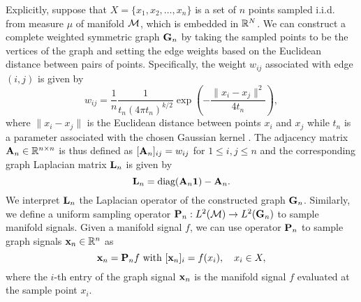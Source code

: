 Explicitly, suppose that $X= \{x_1, x_2,\dots, x_n\}$ is a set of $n$ points sampled i.i.d. from measure $\mu$ of manifold ${\mathcal M}$, which is embedded in ${\mathbb R}^N$. We can construct a complete weighted symmetric graph ${\mathbf G}_n$ by taking the sampled points to be the vertices of the graph and setting the edge weights based on the Euclidean distance between pairs of points. Specifically, the weight $w_{ij}$ associated with edge $(i,j)$ is given by
\begin{equation}\label{eqn:weight}
    w_{ij}=\frac{1}{n}\frac{1}{t_n(4\pi t_n)^{k/2}}\exp\left(-\frac{\|x_i-x_j\|^2}{4t_n}\right),
\end{equation}
where $\|x_i-x_j\|$ is the Euclidean distance between points $x_i$ and $x_j$ while $t_n$ is a parameter associated with the chosen Gaussian kernel \cite{belkin2008towards}. The adjacency matrix ${\mathbf A}_n \in {\mathbb R}^{n\times n}$ is thus defined as $[{\mathbf A}_n]_{ij}=w_{ij}$ for $1 \leq i,j\leq n$ and the corresponding graph Laplacian matrix ${\mathbf L}_n$ \cite{merris1995survey} is given by
\begin{equation}
    {\ensuremath{\mathbf L}}_n = \mbox{diag}({\mathbf A}_n \boldsymbol{1})-{\mathbf A}_n.
\end{equation}
We interpret ${\mathbf L}_n$ the Laplacian operator of the constructed graph ${\mathbf G}_n$. 
Similarly, we define a uniform sampling operator ${\mathbf P}_n: L^2({\mathcal M})\rightarrow L^2({\mathbf G}_n)$ to sample manifold signals. Given a manifold signal $f$, we can use operator ${\mathbf P}_n$ to sample graph signals ${\mathbf x}_n \in {\mathbb R}^n$ as
\begin{equation}
\label{eqn:sampling}
    {\ensuremath{\mathbf x}}_n = {\mathbf P}_n f\text{ with }[{\mathbf x}_n]_i = f(x_i), \quad  x_i \in X,
\end{equation}
where the $i$-th entry of the graph signal ${\mathbf x}_n$ is the manifold signal $f$ evaluated at the sample point $x_i$. 

